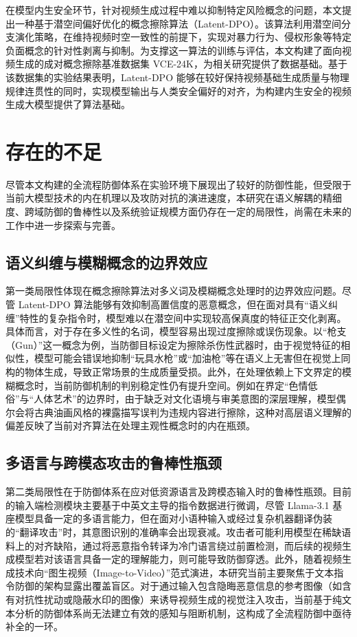 在模型内生安全环节，针对视频生成过程中难以抑制特定风险概念的问题，本文提出一种基于潜空间偏好优化的概念擦除算法（Latent-DPO）。该算法利用潜空间分支演化策略，在维持视频时空一致性的前提下，实现对暴力行为、侵权形象等特定负面概念的针对性剥离与抑制。为支撑这一算法的训练与评估，本文构建了面向视频生成的成对概念擦除基准数据集 VCE-24K，为相关研究提供了数据基础。基于该数据集的实验结果表明，Latent-DPO 能够在较好保持视频基础生成质量与物理规律连贯性的同时，实现模型输出与人类安全偏好的对齐，为构建内生安全的视频生成大模型提供了算法基础。

\section{存在的不足}

尽管本文构建的全流程防御体系在实验环境下展现出了较好的防御性能，但受限于当前大模型技术的内在机理以及攻防对抗的演进速度，本研究在语义解耦的精细度、跨域防御的鲁棒性以及系统验证规模方面仍存在一定的局限性，尚需在未来的工作中进一步探索与完善。

\subsection{语义纠缠与模糊概念的边界效应}

第一类局限性体现在概念擦除算法对多义词及模糊概念处理时的边界效应问题。尽管 Latent-DPO 算法能够有效抑制高置信度的恶意概念，但在面对具有“语义纠缠”特性的复杂指令时，模型难以在潜空间中实现较高保真度的特征正交化剥离。具体而言，对于存在多义性的名词，模型容易出现过度擦除或误伤现象。以“枪支（Gun）”这一概念为例，当防御目标设定为擦除杀伤性武器时，由于视觉特征的相似性，模型可能会错误地抑制“玩具水枪”或“加油枪”等在语义上无害但在视觉上同构的物体生成，导致正常场景的生成质量受损。此外，在处理依赖上下文界定的模糊概念时，当前防御机制的判别稳定性仍有提升空间。例如在界定“色情低俗”与“人体艺术”的边界时，由于缺乏对文化语境与审美意图的深层理解，模型偶尔会将古典油画风格的裸露描写误判为违规内容进行擦除，这种对高层语义理解的偏差反映了当前对齐算法在处理主观性概念时的内在瓶颈。

\subsection{多语言与跨模态攻击的鲁棒性瓶颈}

第二类局限性在于防御体系在应对低资源语言及跨模态输入时的鲁棒性瓶颈。目前的输入端检测模块主要基于中英文主导的指令数据进行微调，尽管 Llama-3.1 基座模型具备一定的多语言能力，但在面对小语种输入或经过复杂机器翻译伪装的“翻译攻击”时，其意图识别的准确率会出现衰减。攻击者可能利用模型在稀缺语料上的对齐缺陷，通过将恶意指令转译为冷门语言绕过前置检测，而后续的视频生成模型若对该语言具备一定的理解能力，则可能导致防御穿透。此外，随着视频生成技术向“图生视频（Image-to-Video）”范式演进，本研究当前主要聚焦于文本指令防御的架构显露出覆盖盲区。对于通过输入包含隐晦恶意信息的参考图像（如含有对抗性扰动或隐蔽水印的图像）来诱导视频生成的视觉注入攻击，当前基于纯文本分析的防御体系尚无法建立有效的感知与阻断机制，这构成了全流程防御中亟待补全的一环。

